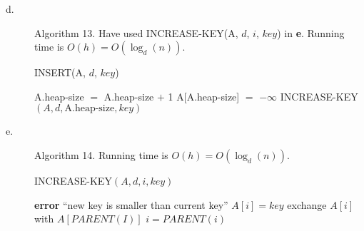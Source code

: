 \documentclass{article}
\begin{document}
\begin{description}
\item[d. ] Algorithm 13. Have used INCREASE-KEY(A, $d$, $i$, $key$) in \textbf{e}. Running time is $O(h) = O(\log_d(n))$.
  \begin{algorithm}
    \caption{INSERT(A, $d$, $key$)}
    \begin{algorithmic}[1]
      \STATE A.heap-size $=$ A.heap-size $+$ 1
      \STATE A[A.heap-size] $=$ $-\infty$
      \STATE INCREASE-KEY$(A, d, \textrm{A.heap-size}, key)$
    \end{algorithmic}
  \end{algorithm}

\item[e. ] Algorithm 14. Running time is $O(h) = O(\log_d(n))$.
  \begin{algorithm}
    \caption{INCREASE-KEY$(A, d, i, key)$}
    \begin{algorithmic}[1]
      \STATE \textbf{error} ``new key is smaller than current key''
      \ENDIF
      \STATE $A[i] = key$
      \STATE exchange $A[i]$ with $A[PARENT(I)]$
      \STATE $i = PARENT(i)$
      \ENDWHILE
    \end{algorithmic}
  \end{algorithm}
\end{description}
\end{document}
